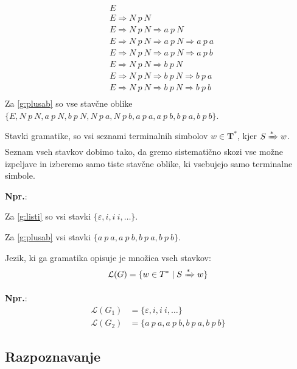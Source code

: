 \documentclass{article}
\newcommand{\Ex}{\textbf{Npr.}:\ }
\newcommand{\Set}[1]{\mathbf{#1}}
\newcommand{\Grammar}{G}
\newcommand{\Terminals}{\Set{T}}
\newcommand{\StartSymbol}{S}
\newcommand{\Null}{\varepsilon}
\newcommand{\Language}[1]{\mathcal{L}(#1)}
\newcommand{\Derive}{\Rightarrow}
\newcommand{\DeriveStar}{\xRightarrow{\ast}}
\newcommand{\Seq}{\ }
\newcommand{\Kleene}[1]{#1^\ast}
\begin{document}
  \begin{align*}
    &E \\
    &E \Derive N \Seq p \Seq N \\
    &E \Derive N \Seq p \Seq N \Derive a \Seq p \Seq N\\
    &E \Derive N \Seq p \Seq N \Derive a \Seq p \Seq N \Derive a \Seq p \Seq a\\
    &E \Derive N \Seq p \Seq N \Derive a \Seq p \Seq N \Derive a \Seq p \Seq b\\
    &E \Derive N \Seq p \Seq N \Derive b \Seq p \Seq N\\
    &E \Derive N \Seq p \Seq N \Derive b \Seq p \Seq N \Derive b \Seq p \Seq a\\
    &E \Derive N \Seq p \Seq N \Derive b \Seq p \Seq N \Derive b \Seq p \Seq b\\
  \end{align*}
Za \ref{g:plusab} so vse stavčne oblike $\{E, N \Seq p \Seq N, a \Seq p \Seq N, b \Seq p \Seq N, N \Seq p \Seq a, N \Seq p \Seq b, a \Seq p \Seq a, a \Seq p \Seq b, b \Seq p \Seq a, b \Seq p \Seq b \}$.

Stavki gramatike, so vsi seznami terminalnih simbolov $w \in \Kleene{\Terminals}$, kjer $\StartSymbol \DeriveStar w$.
Seznam vseh stavkov dobimo tako, da gremo sistematično skozi vse možne izpeljave in izberemo samo tiste stavčne oblike, ki vsebujejo samo terminalne simbole.

\Ex

Za \ref{g:listi} so vsi stavki $\{\Null, i, i \Seq i, \dots\}$.

Za \ref{g:plusab} vsi stavki $\{a \Seq p \Seq a, a \Seq p \Seq b, b \Seq p \Seq a, b \Seq p \Seq b \}$.

Jezik, ki ga gramatika opisuje je množica vseh stavkov:
\begin{equation*}
  \Language{\Grammar} = \{ w \in \Kleene{T} \mid \StartSymbol \DeriveStar w\}
\end{equation*}

\Ex
  \begin{align*}
    \Language{\Grammar_1} &= \{\Null, i, i \Seq i, \dots\}\\
    \Language{\Grammar_2} &= \{a \Seq p \Seq a, a \Seq p \Seq b, b \Seq p \Seq a, b \Seq p \Seq b \}
  \end{align*}

\subsection{Razpoznavanje}
\end{document}
